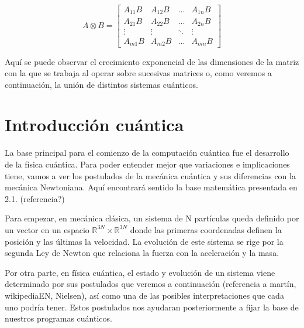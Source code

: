 \begin{equation*}
A\otimes B = \begin{bmatrix}
A_{11}B & A_{12}B & ... & A_{1n}B\\
A_{21}B & A_{22}B & ... & A_{2n}B\\
\vdots & \vdots & \ddots & \vdots\\
A_{m1}B & A_{m2}B & ... & A_{mn}B
\end{bmatrix}
\end{equation*}

\vspace{5pt}
Aquí se puede observar el crecimiento exponencial de las dimensiones de la matriz con la que se trabaja al operar sobre sucesivas matrices o, como veremos a continuación, la unión de distintos sistemas cuánticos.

\vspace{15pt}

\section{Introducción cuántica}
La base principal para el comienzo de la computación cuántica fue el desarrollo de la física cuántica. Para poder entender mejor que variaciones e implicaciones tiene, vamos a ver los postulados de la mecánica cuántica y sus diferencias con la mecánica Newtoniana. Aquí encontrará sentido la base matemática presentada en 2.1. (referencia?)

\vspace{5pt}

Para empezar, en mecánica clásica, un sistema de N partículas queda definido por un vector en un espacio $\mathbb{R}^{3N} \times \mathbb{R}^{3N}$ donde las primeras coordenadas definen la posición y las últimas la velocidad. La evolución de este sistema se rige por la segunda Ley de Newton que relaciona la fuerza con la aceleración y la masa.

\vspace{5pt}

Por otra parte, en física cuántica, el estado y evolución de un sistema viene determinado por sus postulados que veremos a continuación (referencia a martín, wikipediaEN, Nielsen), así como una de las posibles interpretaciones que cada uno podría tener. Estos postulados nos ayudaran posteriormente a fijar la base de nuestros programas cuánticos.

\vspace{15pt}


